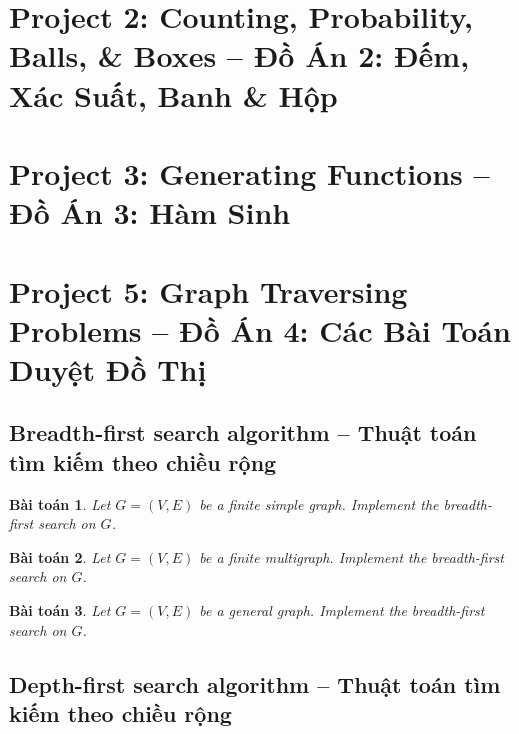 \documentclass{article}
\newtheorem{baitoan}{Bài toán}
\begin{document}

\section{Project 2: Counting, Probability, Balls, \& Boxes -- Đồ Án 2: Đếm, Xác Suất, Banh \& Hộp}


\section{Project 3: Generating Functions -- Đồ Án 3: Hàm Sinh}


\section{Project 5: Graph Traversing Problems -- Đồ Án 4: Các Bài Toán Duyệt Đồ Thị}


\subsection{Breadth-first search algorithm -- Thuật toán tìm kiếm theo chiều rộng}

\begin{baitoan}
    Let $G = (V,E)$ be a finite simple graph. Implement the breadth-first search on $G$.
\end{baitoan}

\begin{baitoan}
    Let $G = (V,E)$ be a finite multigraph. Implement the breadth-first search on $G$.
\end{baitoan}

\begin{baitoan}
    Let $G = (V,E)$ be a general graph. Implement the breadth-first search on $G$.
\end{baitoan}


\subsection{Depth-first search algorithm -- Thuật toán tìm kiếm theo chiều rộng}
\end{document}
